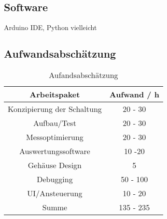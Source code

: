 \subsection*{Software}
Arduino IDE, Python vielleicht

\subsection*{Aufwandsabschätzung}
\begin{table}[H]
    \label{tab:zwei}
    \centering
    \caption{Aufandsabschätzung}
    \begin{tabular}{cc} \hline
    Arbeitspaket & Aufwand / h \\ \hline
    Konzipierung der Schaltung &  20 - 30 \\ \hline
    Aufbau/Test & 20 - 30\\ \hline
    Messoptimierung & 20 - 30  \\ \hline
    Auswertungssoftware & 10 -20 \\ \hline
    Gehäuse Design & 5  \\ \hline
    Debugging & 50 - 100 \\ \hline
    UI/Ansteuerung  & 10 - 20  \\ \hline \hline
    Summe & 135 - 235  \\ \hline
    \end{tabular}
    \end{table}